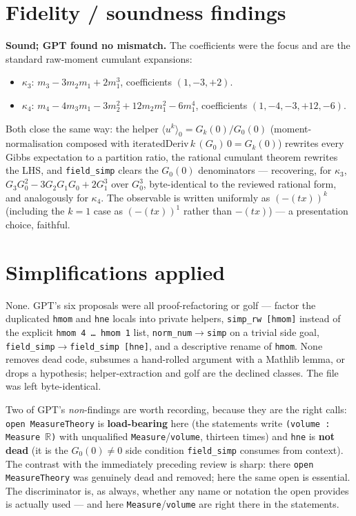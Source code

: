 \documentclass[11pt]{article}
\begin{document}
\section{Fidelity / soundness findings}
\textbf{Sound; GPT found no mismatch.} The coefficients were the focus and are the standard raw-moment
cumulant expansions:
\begin{itemize}[noitemsep]
  \item $\kappa_3$: $m_3-3m_2m_1+2m_1^3$, coefficients $(1,-3,+2)$.
  \item $\kappa_4$: $m_4-4m_3m_1-3m_2^2+12m_2m_1^2-6m_1^4$, coefficients $(1,-4,-3,+12,-6)$.
\end{itemize}
Both close the same way: the helper $\langle u^k\rangle_0=G_k(0)/G_0(0)$ (moment-normalisation composed with
$\mathrm{iteratedDeriv}\,k\,(G_0)\,0=G_k(0)$) rewrites every Gibbs expectation to a partition ratio, the
rational cumulant theorem rewrites the LHS, and \texttt{field\_simp} clears the $G_0(0)$ denominators ---
recovering, for $\kappa_3$, $G_3G_0^2-3G_2G_1G_0+2G_1^3$ over $G_0^3$, byte-identical to the reviewed
rational form, and analogously for $\kappa_4$. The observable is written uniformly as $(-(tx))^k$ (including
the $k=1$ case as $(-(tx))^1$ rather than $-(tx)$) --- a presentation choice, faithful.

\section{Simplifications applied}
None. GPT's six proposals were all proof-refactoring or golf --- factor the duplicated \texttt{hmom} and
\texttt{hne} locals into private helpers, \texttt{simp\_rw [hmom]} instead of the explicit \texttt{hmom 4 \dots
hmom 1} list, \texttt{norm\_num}$\to$\texttt{simp} on a trivial side goal, \texttt{field\_simp}$\to$\texttt{field\_simp
[hne]}, and a descriptive rename of \texttt{hmom}. None removes dead code, subsumes a hand-rolled argument
with a Mathlib lemma, or drops a hypothesis; helper-extraction and golf are the declined classes. The file was
left byte-identical.

Two of GPT's \emph{non}-findings are worth recording, because they are the right calls: \texttt{open
MeasureTheory} is \textbf{load-bearing} here (the statements write \texttt{(volume : Measure $\mathbb R$)}
with unqualified \texttt{Measure}/\texttt{volume}, thirteen times) and \texttt{hne} is \textbf{not dead} (it is
the $G_0(0)\ne0$ side condition \texttt{field\_simp} consumes from context). The contrast with the immediately
preceding review is sharp: there \texttt{open MeasureTheory} was genuinely dead and removed; here the same open
is essential. The discriminator is, as always, whether any name or notation the open provides is actually
used --- and here \texttt{Measure}/\texttt{volume} are right there in the statements.
\end{document}
